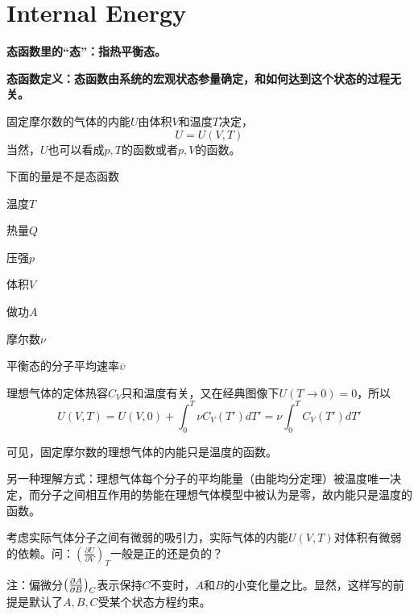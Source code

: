 \documentclass[CJK]{beamer}
\begin{document}
\section{Internal Energy}

\begin{frame}
\bch
\bitem
\item{\bf 态函数里的“态”：指热平衡态。}
\item{\bf 态函数定义：态函数由系统的宏观状态参量确定，和如何达到这个状态的过程无关。}
\eitem

\bex
固定摩尔数的气体的内能$U$由体积$V$和温度$T$决定，
$$ U  = U(V, T)$$
当然，$U$也可以看成$p, T$的函数或者$p, V$的函数。
\eex

\ech
\end{frame}

\begin{frame}
\bch
下面的量是不是态函数
\bitem
\item{温度$T$}
\item{热量$Q$}
\item{压强$p$}
\item{体积$V$}
\item{做功$A$}
\item{摩尔数$\nu$}
\item{平衡态的分子平均速率$\overline{\upsilon}$}
\eitem
\ech
\end{frame}

\begin{frame}
\bch

理想气体的定体热容$C_V$只和温度有关，又在经典图像下$U(T\rightarrow 0) = 0$，所以
$$ U(V, T) = U(V, 0) + \int_0^T \nu C_V(T') dT' =\nu  \int_0^T C_V(T') dT'  $$

可见，固定摩尔数的理想气体的内能只是温度的函数。

\skiplines

另一种理解方式：理想气体每个分子的平均能量（由能均分定理）被温度唯一决定，而分子之间相互作用的势能在理想气体模型中被认为是零，故内能只是温度的函数。

\ech
\end{frame}



\begin{frame}
\bch
{}

考虑实际气体分子之间有微弱的吸引力，实际气体的内能$U(V,T)$对体积有微弱的依赖。问：$\left(\frac{\partial U}{\partial V}\right)_T$一般是正的还是负的？

\skiplines

注：偏微分$\left(\frac{\partial A}{\partial B}\right)_{C}$表示保持$C$不变时，$A$和$B$的小变化量之比。显然，这样写的前提是默认了$A,B,C$受某个状态方程约束。
\ech
\end{frame}
\end{document}

